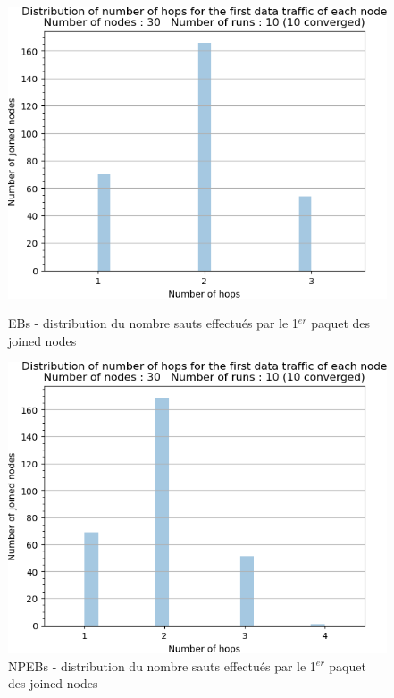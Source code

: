 \documentclass[]{report}
\begin{document}
\newpage

\begin{figure}[!ht]
	\begin{minipage}{0.49\textwidth}
		\centering
		\includegraphics[width=\textwidth]{results/EB/firsthop.hist}
		\caption{EBs - distribution du nombre sauts effectués par le 1$^{er}$ paquet des joined nodes}
		\label{fig:EBfirsthop}
	\end{minipage}\hfill
	\begin{minipage}{0.5\textwidth}
		\centering
		\includegraphics[width=\textwidth]{results/NPEB/firsthop.hist}
		\caption{NPEBs - distribution du nombre sauts effectués par le 1$^{er}$ paquet des joined nodes}
		\label{fig:NPEBfirsthop}
	\end{minipage}	
\end{figure}
\end{document}
